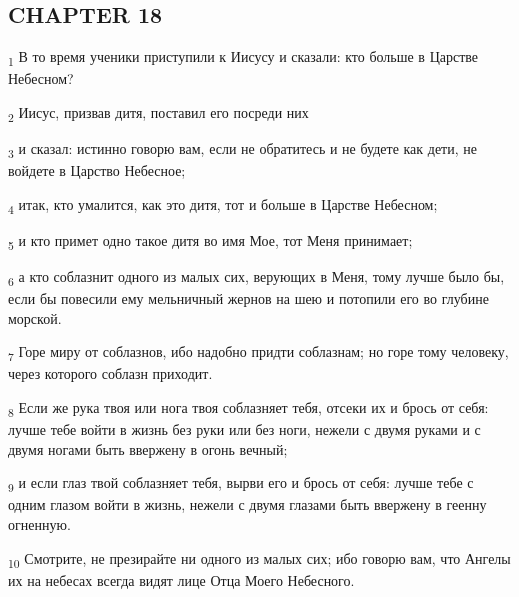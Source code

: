 \subsection{CHAPTER 18}
\begin{tcolorbox}
\textsubscript{1} В то время ученики приступили к Иисусу и сказали: кто больше в Царстве Небесном?
\end{tcolorbox}
\begin{tcolorbox}
\textsubscript{2} Иисус, призвав дитя, поставил его посреди них
\end{tcolorbox}
\begin{tcolorbox}
\textsubscript{3} и сказал: истинно говорю вам, если не обратитесь и не будете как дети, не войдете в Царство Небесное;
\end{tcolorbox}
\begin{tcolorbox}
\textsubscript{4} итак, кто умалится, как это дитя, тот и больше в Царстве Небесном;
\end{tcolorbox}
\begin{tcolorbox}
\textsubscript{5} и кто примет одно такое дитя во имя Мое, тот Меня принимает;
\end{tcolorbox}
\begin{tcolorbox}
\textsubscript{6} а кто соблазнит одного из малых сих, верующих в Меня, тому лучше было бы, если бы повесили ему мельничный жернов на шею и потопили его во глубине морской.
\end{tcolorbox}
\begin{tcolorbox}
\textsubscript{7} Горе миру от соблазнов, ибо надобно придти соблазнам; но горе тому человеку, через которого соблазн приходит.
\end{tcolorbox}
\begin{tcolorbox}
\textsubscript{8} Если же рука твоя или нога твоя соблазняет тебя, отсеки их и брось от себя: лучше тебе войти в жизнь без руки или без ноги, нежели с двумя руками и с двумя ногами быть ввержену в огонь вечный;
\end{tcolorbox}
\begin{tcolorbox}
\textsubscript{9} и если глаз твой соблазняет тебя, вырви его и брось от себя: лучше тебе с одним глазом войти в жизнь, нежели с двумя глазами быть ввержену в геенну огненную.
\end{tcolorbox}
\begin{tcolorbox}
\textsubscript{10} Смотрите, не презирайте ни одного из малых сих; ибо говорю вам, что Ангелы их на небесах всегда видят лице Отца Моего Небесного.
\end{tcolorbox}
